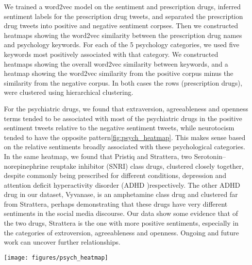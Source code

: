 We trained a word2vec model on the sentiment and prescription drugs, inferred sentiment labels for the prescription drug tweets, and separated the prescription drug tweets into positive and negative sentiment corpses. Then we constructed heatmaps showing the word2vec similarity between the prescription drug names and psychology keywords. For each of the 5 psychology categories, we used five keywords most positively associated with that category. We constructed heatmaps showing the overall word2vec similarity between keywords, and a heatmap showing the word2vec similarity from the positive corpus minus the similarity from the negative corpus. In both cases the rows (prescription drugs), were clustered using hierarchical clustering. 

For the psychiatric drugs, we found that extraversion, agreeableness and openness terms tended to be associated with most of the psychiatric drugs in the positive sentiment tweets relative to the negative sentiment tweets, while neurotocism tended to have the opposite pattern\ref{fig:psych_heatmap}. This makes sense based on the relative sentiments broadly associated with these psychological categories. In the same heatmap, we found that Pristiq and Strattera, two Serotonin–norepinephrine reuptake inhibitor (SNRI) class drugs\cite{howland2010potential}, clustered closely together, despite commonly being prescribed for different conditions, depression and attention deficit hyperactivity disorder (ADHD )respectively. The other ADHD drug in our dataset, Vyvanase, is an amphetamine class drug and clustered far from Strattera, perhaps demonstrating that these drugs have very different sentiments in the social media discourse. Our data show some evidence that of the two drugs, Strattera is the one with more positive sentiments, especially in the categories of extroversion, agreeableness and openness. Ongoing and future work can uncover further relationships.

\begin{figure*}
\centering
\texttt{[image: figures/psych\_heatmap]}
\caption{Relative similarity for psychiatric drug and personality keywords for positive sentiment tweets relative to negative sentiment tweets. The top 5 personality keywords associated with each of the following big 5 categories are shown in order: extraversion, agreeableness, conscientiousness, openness, neuroticism.}
\label{fig:psych_heatmap}
\end{figure*}

